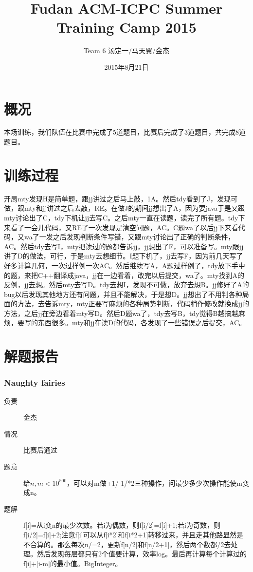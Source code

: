 \documentclass[a4paper, 11pt, nofonts, nocap, fancyhdr]{ctexart}
\title{Fudan ACM-ICPC Summer Training Camp 2015}
\author{Team 6 汤定一/马天翼/金杰}
\date{2015年8月21日}
\newcommand{\problem}[1]{\subsubsection{#1}}
\begin{document}
\maketitle

\section{概况}

本场训练，我们队伍在比赛中完成了5道题目，比赛后完成了3道题目，共完成8道题目。

\section{训练过程}

开局mty发现H是简单题，跟jj讲过之后马上敲，1A。然后tdy看到了J，发现可做，跟mty和jj讲过之后去敲，RE。在做J的期间jj想出了A，因为要java于是又跟mty讨论出了C，tdy下机让jj去写C。之后mty一直在读题，读完了所有题。tdy下来看了一会儿代码，又RE了一次发现是清空问题，AC。C题wa了以后jj下来看代码，又wa了一发之后发现判断条件写错，又跟mty讨论出了正确的判断条件，AC。然后tdy去写I，mty把读过的题都告诉jj，jj想出了F，可以准备写。mty跟jj讲了D的做法，可行，于是mty去想细节。I题下机了，jj去写F，因为前几天写了好多计算几何，一次过样例一次AC。然后继续写A，A题过样例了，tdy放下手中的题，来把C++翻译成java，jj在一边看着，改完以后提交，wa了。mty找到A的反例，jj去想。然后mty去写D。tdy去想I，发现不可做，放弃去想B。jj修好了A的bug以后发现其他地方还有问题，并且不能解决，于是想D。jj想出了不用判各种局面的方法，去告诉mty，mty正要写麻烦的各种局势判断，代码稍作修改就换成jj的方法，之后jj在旁边看着mty写D。然后D题wa了，tdy去写B，tdy觉得B越搞越麻烦，要写的东西很多。mty和jj在读D的代码，各发现了一些错误之后提交，AC。

\section{解题报告}

\problem{Naughty fairies}

\begin{description}
\item[负责] 金杰
\item[情况] 比赛后通过
\item[题意]
给$n,m<10^{500}$，可以对m做+1/-1/*2三种操作，问最少多少次操作能使m变成n。
\item[题解]
f[i]=从i变n的最少次数。若i为偶数，则f[i/2]=f[i]+1;若i为奇数，则f[i/2]=f[i]+2;注意f[i]可以从f[i*2]和f[i*2+1]转移过来，并且走其他路显然是不合算的。那么每次n/=2，更新f[n/2]和f[n/2+1]，然后两个数都/2去处理。然后发现每层都只有2个值要计算，效率log。最后再计算每个计算过的f[i]+|i-m|的最小值。BigInteger。
\end{description}
\end{document}
